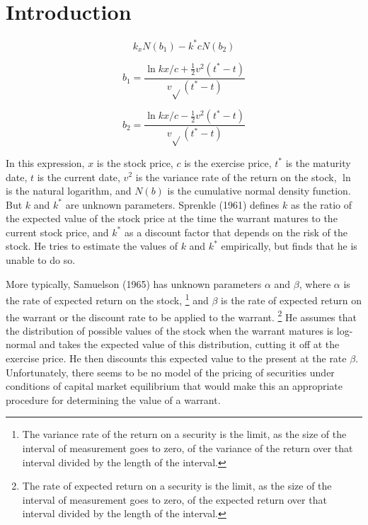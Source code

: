 \documentclass[a4paper, 12pt, twoside]{article}
\begin{document}
\section*{Introduction}




$$
k_x N(b_1)- k^* c N(b_2)
$$

$$
b_1 = \frac{\ln kx/c + {\displaystyle \frac{1}{2}} v^2 (t^*-t)}{v \sqrt{}(t^*-t)}
$$

$$
b_2 = \frac{\ln kx/c - {\displaystyle \frac{1}{2}} v^2 (t^*-t)}{v \sqrt{}(t^*-t)}
$$

\vspace*{3mm}

\noindent In this expression, $x$ is the stock price, $c$ is the exercise price, $t^*$ is the maturity 
date, $t$ is the current date, $v^2$ is the variance rate of the return on the stock, $\ln$
is the natural logarithm, and $N(b)$ is the cumulative normal density function. But $k$ 
and $k^*$ are unknown parameters. Sprenkle (1961) defines $k$ as the ratio of the expected 
value of the stock price at the time the warrant matures to the current stock price, 
and $k^*$ as a discount factor that depends on the risk of the stock. He tries to 
estimate the values of $k$ and $k^*$ empirically, but finds that he is unable to do so.

More typically, Samuelson (1965) has unknown parameters $\alpha$ and $\beta$, where $\alpha$ is the rate 
of expected return on the stock, \footnote{\linespread{1}\fontsize{10}{10}\selectfont 
The variance rate of the return on a security is the limit, as the size 
of the interval of measurement goes to zero, of the variance of the return over that 
interval divided by the length of the interval.} 
and $\beta$ is the rate of expected return on the warrant 
or the discount rate to be applied to the warrant. \footnote{\linespread{1}\fontsize{10}{10}\selectfont The rate of expected return on a security is the limit, as the size of 
the interval of measurement goes to zero, of the expected return over that interval 
divided by the length of the interval.}  
He assumes that the distribution of 
possible values of the stock when the warrant matures is log-normal and takes the 
expected value of this distribution, cutting it off at the exercise price. He then 
discounts this expected value to the present at the rate $\beta$. Unfortunately, there seems 
to be no model of the pricing of securities under conditions of capital market 
equilibrium that would make this an appropriate procedure for determining the value of 
a warrant.
\end{document}
